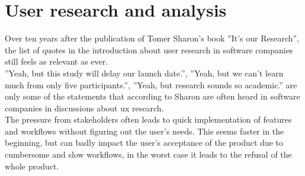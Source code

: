 %
\chapter{User research and analysis}
\label{chap:research}


Over ten years after the publication of Tomer Sharon's book ''It's our Research'', the list of quotes in the introduction about user research in software companies still feels as relevant as ever.
\\
''Yeah, but this study will delay our launch date.'', ''Yeah, but we can't learn much from only five participants.'', ''Yeah, but research sounds so academic.'' \cite[p. 4]{Sharon:2012mk} are only some of the statements that according to Sharon are often heard in software companies in discussions about \Gls{ux} research.
\\
The pressure from stakeholders often leads to quick implementation of features and workflows without figuring out the user's needs.
This seems faster in the beginning, but can badly impact the user's acceptance of the product due to cumbersome and slow workflows,
in the worst case it leads to the refusal of the whole product.

